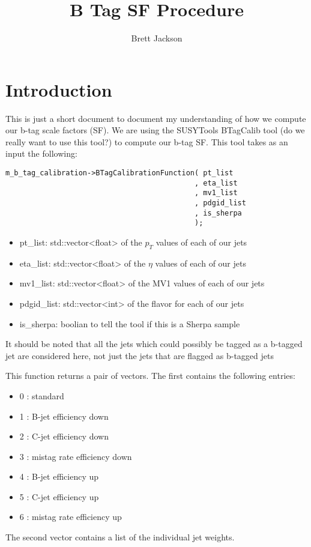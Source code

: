 \documentclass[12]{article}
\title{B Tag SF Procedure}
\author{Brett Jackson}
\begin{document}
\maketitle
\section{Introduction}
This is just a short document to document my understanding of how we compute our b-tag scale factors (SF).
We are using the SUSYTools BTagCalib tool ({\color{red}do we really want to use this tool?}) to compute our b-tag SF.
This tool takes as an input the following:

\begin{lstlisting}
m_b_tag_calibration->BTagCalibrationFunction( pt_list
                                            , eta_list
                                            , mv1_list
                                            , pdgid_list
                                            , is_sherpa
                                            );
\end{lstlisting}

\begin{itemize}
\item pt\_list: std::vector<float> of the $p_T$ values of each of our jets
\item eta\_list: std::vector<float> of the $\eta$ values of each of our jets
\item mv1\_list: std::vector<float> of the MV1 values of each of our jets
\item pdgid\_list: std::vector<int> of the flavor for each of our jets
\item is\_sherpa: boolian to tell the tool if this is a Sherpa sample
\end{itemize}

It should be noted that all the jets which could possibly be tagged as a b-tagged jet are considered here, not just the jets that are flagged as b-tagged jets 

This function returns a pair of vectors. The first contains the following entries:
\begin{itemize}
\item 0 : standard
\item 1 : B-jet efficiency down
\item 2 : C-jet efficiency down
\item 3 : mistag rate efficiency down
\item 4 : B-jet efficiency up
\item 5 : C-jet efficiency up
\item 6 : mistag rate efficiency up
\end{itemize}
The second vector contains a list of the individual jet weights.
\end{document}
